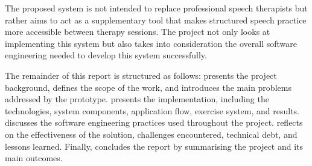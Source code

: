 The proposed system is not intended to replace professional speech therapists but rather aims to act as a supplementary tool that makes structured speech practice more accessible between therapy sessions. The project not only looks at implementing this system but also takes into consideration the overall software engineering needed to develop this system successfully.

The remainder of this report is structured as follows:  presents the project background, defines the scope of the work, and introduces the main problems addressed by the prototype.  presents the implementation, including the technologies, system components, application flow, exercise system, and results.  discusses the software engineering practices used throughout the project.  reflects on the effectiveness of the solution, challenges encountered, technical debt, and lessons learned. Finally,  concludes the report by summarising the project and its main outcomes.
